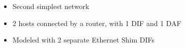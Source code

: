 \begin{itemize}
    \item Second simplest network
    \item 2 hosts connected by a router, with 1 DIF and 1 DAF
    \item Modeled with 2 separate Ethernet Shim DIFs
\end{itemize}
